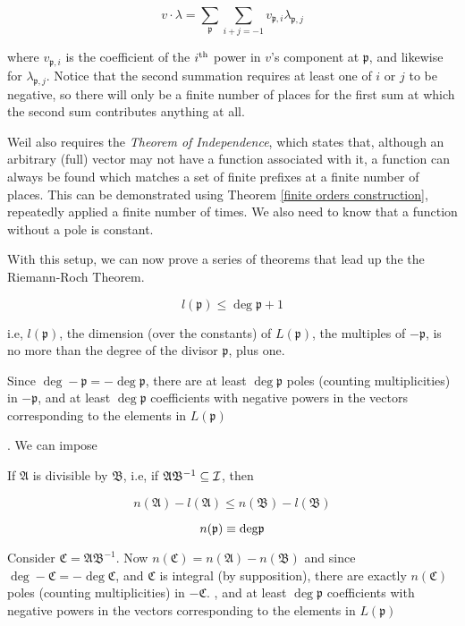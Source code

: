 $$ v \cdot \lambda = \sum_{\mathfrak{p}} \sum_{i+j=-1} v_{\mathfrak{p},i}
  \lambda_{\mathfrak{p},j} $$

where $v_{\mathfrak{p},i}$ is the coefficient of the $i^{\rm th}$
power in $v$'s component at $\mathfrak{p}$, and likewise for
$\lambda_{\mathfrak{p},j}$.  Notice that the second summation requires
at least one of $i$ or $j$ to be negative, so there will only be a
finite number of places for the first sum at which the second sum
contributes anything at all.

Weil also requires the {\it Theorem of Independence}, which states
that, although an arbitrary (full) vector may not have a function
associated with it, a function can always be found which matches a set
of finite prefixes at a finite number of places.  This can be
demonstrated using Theorem \ref{finite orders construction},
repeatedly applied a finite number of times.  We also need to know
that a function without a pole is constant.

With this setup, we can now prove a series of theorems that lead up
the the Riemann-Roch Theorem.

\theorem

$$l(\mathfrak{p}) \leq \deg \mathfrak{p} +1$$

i.e, $l(\mathfrak{p})$, the dimension (over the constants) of
$L(\mathfrak{p})$, the multiples of $-\mathfrak{p}$, is no more than
the degree of the divisor $\mathfrak{p}$, plus one.

\proof

Since $\deg -\mathfrak{p} = - \deg \mathfrak{p}$, there are at least
$\deg \mathfrak{p}$ poles (counting multiplicities) in
$-\mathfrak{p}$, and at least $\deg \mathfrak{p}$
coefficients with negative powers in the vectors corresponding
to the elements in $L(\mathfrak{p})$

.  We can impose

\endtheorem

\theorem

If $\mathfrak{A}$ is divisible by $\mathfrak{B}$, i.e, if
$\mathfrak{A}\mathfrak{B}^{-1} \subseteq {\cal I}$, then

$$n(\mathfrak{A}) - l(\mathfrak{A}) \leq n(\mathfrak{B}) - l(\mathfrak{B}) $$

$$n(\mathfrak{p}) \equiv {\rm deg} \mathfrak{p}$$

\proof

Consider $\mathfrak{C} = \mathfrak{A}\mathfrak{B}^{-1}$.
Now $n(\mathfrak{C}) = n(\mathfrak{A}) - n(\mathfrak{B})$ and since
$\deg -\mathfrak{C} = - \deg \mathfrak{C}$, and
$\mathfrak{C}$ is integral (by supposition),
there are exactly
$n(\mathfrak{C})$ poles (counting multiplicities) in $-\mathfrak{C}$.
, and at least $\deg \mathfrak{p}$
coefficients with negative powers in the vectors corresponding
to the elements in $L(\mathfrak{p})$

